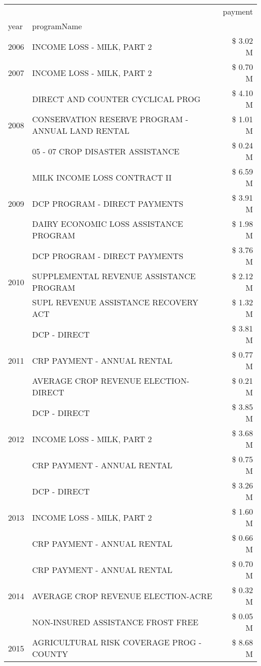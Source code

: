 \begin{tabular}{llr}
\toprule
 &  & payment \\
year & programName &  \\
\midrule
2006 & INCOME LOSS - MILK, PART 2 & \$ 3.02 M \\
\cline{1-3}
2007 & INCOME LOSS - MILK, PART 2 & \$ 0.70 M \\
\cline{1-3}
\multirow[t]{3}{*}{2008} & DIRECT AND COUNTER CYCLICAL PROG & \$ 4.10 M \\
 & CONSERVATION RESERVE PROGRAM - ANNUAL LAND RENTAL & \$ 1.01 M \\
 & 05 - 07 CROP DISASTER ASSISTANCE & \$ 0.24 M \\
\cline{1-3}
\multirow[t]{3}{*}{2009} & MILK INCOME LOSS CONTRACT II & \$ 6.59 M \\
 & DCP PROGRAM - DIRECT PAYMENTS & \$ 3.91 M \\
 & DAIRY ECONOMIC LOSS ASSISTANCE PROGRAM & \$ 1.98 M \\
\cline{1-3}
\multirow[t]{3}{*}{2010} & DCP PROGRAM - DIRECT PAYMENTS & \$ 3.76 M \\
 & SUPPLEMENTAL REVENUE ASSISTANCE PROGRAM & \$ 2.12 M \\
 & SUPL REVENUE ASSISTANCE RECOVERY ACT & \$ 1.32 M \\
\cline{1-3}
\multirow[t]{3}{*}{2011} & DCP - DIRECT & \$ 3.81 M \\
 & CRP PAYMENT - ANNUAL RENTAL & \$ 0.77 M \\
 & AVERAGE CROP REVENUE ELECTION-DIRECT & \$ 0.21 M \\
\cline{1-3}
\multirow[t]{3}{*}{2012} & DCP - DIRECT & \$ 3.85 M \\
 & INCOME LOSS - MILK, PART 2 & \$ 3.68 M \\
 & CRP PAYMENT - ANNUAL RENTAL & \$ 0.75 M \\
\cline{1-3}
\multirow[t]{3}{*}{2013} & DCP - DIRECT & \$ 3.26 M \\
 & INCOME LOSS - MILK, PART 2 & \$ 1.60 M \\
 & CRP PAYMENT - ANNUAL RENTAL & \$ 0.66 M \\
\cline{1-3}
\multirow[t]{3}{*}{2014} & CRP PAYMENT - ANNUAL RENTAL & \$ 0.70 M \\
 & AVERAGE CROP REVENUE ELECTION-ACRE & \$ 0.32 M \\
 & NON-INSURED ASSISTANCE FROST FREE & \$ 0.05 M \\
\cline{1-3}
\multirow[t]{3}{*}{2015} & AGRICULTURAL RISK COVERAGE PROG - COUNTY & \$ 8.68 M \\

\end{tabular}
